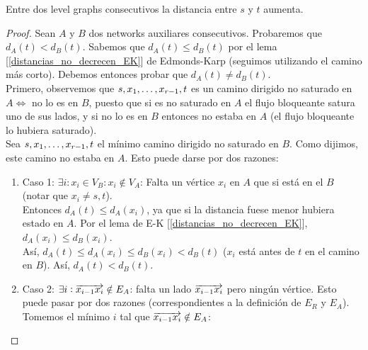 \begin{theorem}
Entre dos level graphs consecutivos la distancia entre $s$ y $t$ aumenta.
\end{theorem}

\begin{proof}
Sean $A$ y $B$ dos networks auxiliares consecutivos. Probaremos que $d_A(t) < d_B(t)$. 
Sabemos que $d_A(t) \le d_B(t)$ por el lema [\ref{distancias_no_decrecen_EK}] de Edmonds-Karp (seguimos utilizando el camino más corto).
Debemos entonces probar que $d_A(t) \neq d_B(t)$.\\
Primero, observemos que $s, x_1, \mathellipsis, x_{r-1}, t$ es un camino dirigido no saturado en $A \iff$ no lo es en $B$, puesto que si es no saturado en $A$ el flujo bloqueante satura uno de sus lados, y si no lo es en $B$ entonces no estaba en $A$ (el flujo bloqueante lo hubiera saturado).\\
Sea $s, x_1, \mathellipsis, x_{r-1}, t$ el mínimo camino dirigido no saturado en $B$. Como dijimos, este camino no estaba en $A$. Esto puede darse por dos razones:

\begin{enumerate}
    \item Caso 1: $\exists i : x_i \in V_B : x_i \notin V_A$: Falta un vértice $x_i$ en $A$ que si está en el $B$ (notar que $x_i \neq s,t$).\\
    Entonces $d_A(t) \le d_A(x_i)$, ya que si la distancia fuese menor hubiera estado en $A$. Por el lema de E-K [\ref{distancias_no_decrecen_EK}], $d_A(x_i) \le d_B(x_i)$.\\
    Así, $d_{A}(t) \le d_{A}(x_i) \le d_{B}(x_i) < d_{B}(t)$ ($x_i$ está antes de $t$ en el camino en $B$). Así, $d_A(t) < d_B(t)$.
    
    \item Caso 2: $\exists i : \overrightarrow{x_{i-1} x_i} \notin E_A$: falta un lado $\overrightarrow{x_{i-1} x_{i}}$ pero ningún vértice. 
    Esto puede pasar por dos razones (correspondientes a la definición de $E_R$ y $E_A$). \\
    Tomemos el mínimo $i$ tal que $\overrightarrow{x_{i-1} x_{i}} \notin E_A$:
    

\end{enumerate}
\end{proof}
